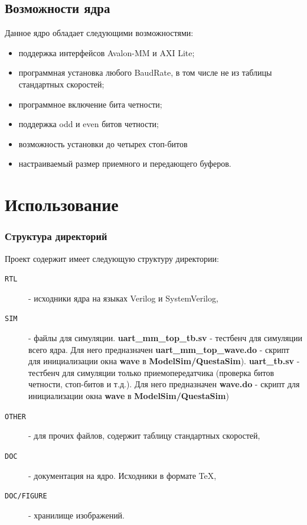 \documentclass[a4paper,12pt]{article}
\begin{document}
    \subsection{Возможности ядра}
    Данное ядро обладает следующими возможностями:
    \begin{itemize}
     \item поддержка интерфейсов Avalon-MM и AXI Lite;
     \item программная установка любого BaudRate, в том числе не из таблицы стандартных скоростей;
     \item программное включение бита четности;
     \item поддержка odd и even битов четности;
     \item возможность установки до четырех стоп-битов
     \item настраиваемый размер приемного и передающего буферов.
    \end{itemize}


\newpage
\section{Использование}
\subsubsection{Структура директорий}
  Проект содержит имеет следующую структуру директории:


\begin{description}
    \item[\texttt{RTL}] - исходники ядра на языках Verilog и SystemVerilog,
    \item[\texttt{SIM}] - файлы для симуляции. \textbf{uart\_mm\_top\_tb.sv} - тестбенч для симуляции всего ядра. Для него предназначен \textbf{uart\_mm\_top\_wave.do} - скрипт для инициализации окна \textbf{wave} в \textbf{ModelSim/QuestaSim}). \textbf{uart\_tb.sv} - тестбенч для симуляции только приемопередатчика (проверка битов четности, стоп-битов и т.д.). Для него предназначен \textbf{wave.do} - скрипт для инициализации окна \textbf{wave} в \textbf{ModelSim/QuestaSim})
    \item[\texttt{OTHER}] - для прочих файлов, содержит таблицу стандартных скоростей,
    \item[\texttt{DOC}] - документация на ядро. Исходники в формате \TeX,
    \item[\texttt{DOC/FIGURE}] - хранилище изображений.
\end{description}
\end{document}
